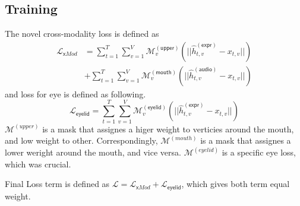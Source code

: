 \documentclass[10pt,twocolumn,letterpaper]{article}
\begin{document}
    \subsection{Training}
    The novel cross-modality loss is defined as
    \begin{equation}
      \begin{split}
        \mathcal{L}_{\mathsf{x}Mod} &= 
          \sum_{t=1}^{T}
          \sum_{v=1}^{V}
          \mathcal{M}_v^{\mathsf{(upper)}}
          (||\hat{h}_{t,v}^{\mathsf{(expr)}} - x_{t,v}||)\\
          &+
          \sum_{t=1}^{T}
          \sum_{v=1}^{V}
          \mathcal{M}_v^{\mathsf{(mouth)}}
          (||\hat{h}_{t,v}^{\mathsf{(audio)}} - x_{t,v}||)  
      \end{split}
    \end{equation}
    and loss for eye is defined as following.
    \begin{equation}
        \mathcal{L}_{\mathsf{eyelid}} = 
          \sum_{t=1}^{T}
          \sum_{v=1}^{V}
          \mathcal{M}_v^{\mathsf{(eyelid)}}
          (||\hat{h}_{t,v}^{\mathsf{(expr)}} - x_{t,v}||)
    \end{equation}
    \(\mathcal{M}^{(upper)}\) is a mask that assignes a higer weight to verticies around the mouth, and low weight to other.
    Correspondingly, \(\mathcal{M}^{(mouth)}\) is a mask that assignes a lower weright around the mouth, and vice versa.
    \(\mathcal{M}^{(eyelid)}\) is a specific eye loss, which was crucial.
    
    Final Loss term is defined as \(\mathcal{L} =\mathcal{L}_{\mathsf{x}Mod}+\mathcal{L}_{\mathsf{eyelid}} \), which gives both term equal weight.



{
  \small
  
  
}
\end{document}
